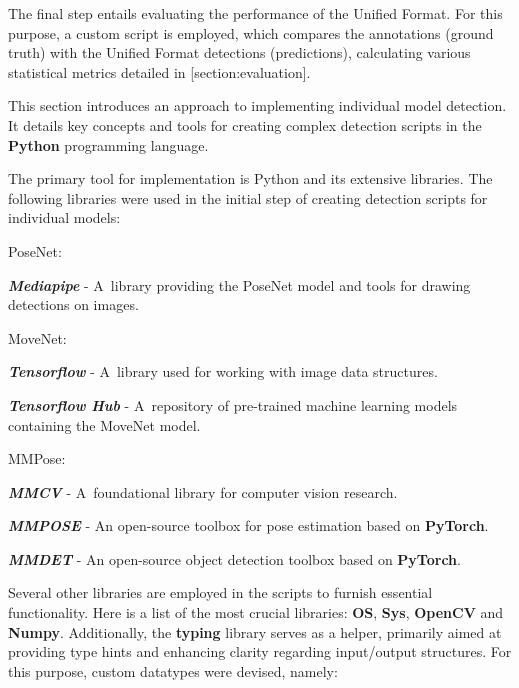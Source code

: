 The final step entails evaluating the performance of the Unified Format. For this purpose, a custom script is employed, which compares the annotations (ground truth) with the Unified Format detections (predictions), calculating various statistical metrics detailed in [section:evaluation].

This section introduces an approach to implementing individual model detection. It details key concepts and tools for creating complex detection scripts in the {\bf Python} programming language.

The primary tool for implementation is Python and its extensive libraries. The following libraries were used in the initial step of creating detection scripts for individual models:

\startitemize[n]
    \item PoseNet:
        \startitemize[1]
            \item {\bf {\em Mediapipe}} - A~library providing the PoseNet model and tools for drawing detections on images.
        \stopitemize
    \item MoveNet:
        \startitemize[1]
            \item {\bf {\em Tensorflow}} - A~library used for working with image data structures.
            \item {\bf {\em Tensorflow Hub}} - A~repository of pre-trained machine learning models containing the MoveNet model.
        \stopitemize
    \item MMPose:
        \startitemize[1]
            \item {\bf {\em MMCV}} - A~foundational library for computer vision research.
            \item {\bf {\em MMPOSE}} - An open-source toolbox for pose estimation based on {\bf PyTorch}.
            \item {\bf {\em MMDET}} - An open-source object detection toolbox based on {\bf PyTorch}.
        \stopitemize
\stopitemize

Several other libraries are employed in the scripts to furnish essential functionality. Here is a list of the most crucial libraries: {\bf OS}, {\bf Sys}, {\bf OpenCV} and {\bf Numpy}. Additionally, the {\bf typing} library serves as a helper, primarily aimed at providing type hints and enhancing clarity regarding input/output structures. For this purpose, custom datatypes were devised, namely:

